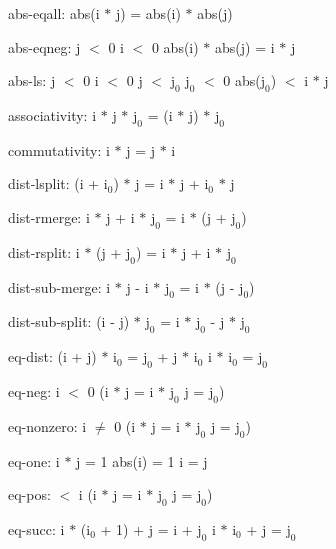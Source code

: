 \documentclass[a4paper]{article}
\begin{document}
\raggedright
              
\item	abs-eqall:  \Fol abs(i $*$ j) = abs(i) $*$ abs(j)

\item	abs-eqneg:  \Fol j $<$ 0 \And i $<$ 0 \Imp abs(i) $*$ abs(j) = i $*$ j

\item	abs-ls:  \Fol j $<$ 0 \And i $<$ 0 \And j $<$ $\mbox{j}_{0}$ \And $\mbox{j}_{0}$ $<$ 0 \Imp abs($\mbox{j}_{0}$) $<$ i $*$ j

\item	associativity:  \Fol i $*$ j $*$ $\mbox{j}_{0}$ = (i $*$ j) $*$ $\mbox{j}_{0}$

\item	commutativity:  \Fol i $*$ j = j $*$ i

\item	dist-lsplit:  \Fol (i + $\mbox{i}_{0}$) $*$ j = i $*$ j + $\mbox{i}_{0}$ $*$ j

\item	dist-rmerge:  \Fol i $*$ j + i $*$ $\mbox{j}_{0}$ = i $*$ (j + $\mbox{j}_{0}$)

\item	dist-rsplit:  \Fol i $*$ (j + $\mbox{j}_{0}$) = i $*$ j + i $*$ $\mbox{j}_{0}$

\item	dist-sub-merge:  \Fol i $*$ j - i $*$ $\mbox{j}_{0}$ = i $*$ (j - $\mbox{j}_{0}$)

\item	dist-sub-split:  \Fol (i - j) $*$ $\mbox{j}_{0}$ = i $*$ $\mbox{j}_{0}$ - j $*$ $\mbox{j}_{0}$

\item	eq-dist:  \Fol (i + j) $*$ $\mbox{i}_{0}$ = $\mbox{j}_{0}$ + j $*$ $\mbox{i}_{0}$ \Equiv i $*$ $\mbox{i}_{0}$ = $\mbox{j}_{0}$

\item	eq-neg:  \Fol i $<$ 0 \Imp (i $*$ j = i $*$ $\mbox{j}_{0}$ \Equiv j = $\mbox{j}_{0}$)

\item	eq-nonzero:  \Fol i $\neq$ 0 \Imp (i $*$ j = i $*$ $\mbox{j}_{0}$ \Equiv j = $\mbox{j}_{0}$)

\item	eq-one:  \Fol i $*$ j = 1 \Equiv abs(i) = 1 \And i = j

\item	eq-pos:   $<$ i \Imp (i $*$ j = i $*$ $\mbox{j}_{0}$ \Equiv j = $\mbox{j}_{0}$)

\item	eq-succ:  \Fol i $*$ ($\mbox{i}_{0}$ + 1) + j = i + $\mbox{j}_{0}$ \Equiv i $*$ $\mbox{i}_{0}$ + j = $\mbox{j}_{0}$
\end{document}
